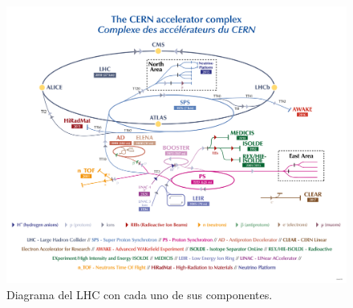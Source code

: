 \documentclass[./../main.tex]{subfiles}
\begin{document}
\begin{exercise}
\begin{solution}
            \begin{figure}[htb]
                \centering
                \includegraphics[scale=0.9]{lhc}
                \caption{Diagrama del LHC con cada uno de sus componentes. \parencite{LHCComplex}}
                \label{fig:LHC}
            \end{figure}
        \end{solution}
    \end{exercise}
\end{document}
